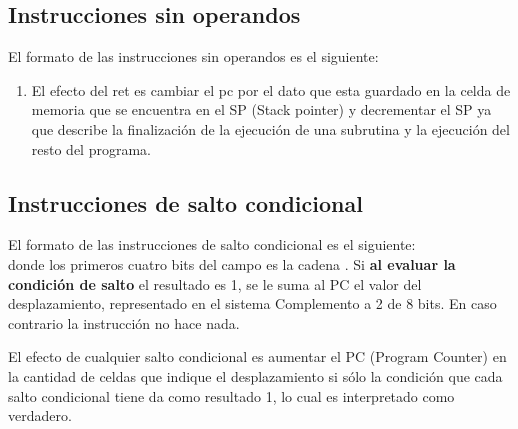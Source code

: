 \subsection{Instrucciones sin operandos}

El formato de las instrucciones sin operandos es el siguiente:\\



\begin{enumerate}
\item  {}
El efecto del ret es cambiar el pc por el dato que esta guardado en la celda de memoria que se encuentra en el SP (Stack pointer) y decrementar el SP ya que describe la finalización de la ejecución de una subrutina y la ejecución del resto del programa.
\end{enumerate}


\subsection{Instrucciones de salto condicional}

El formato de las instrucciones de salto condicional es el siguiente:\\

 donde los primeros cuatro bits del campo  es la cadena . Si \textbf{al evaluar la condición de salto} el resultado es 1, se le suma al PC el valor del desplazamiento, representado en el sistema Complemento a 2 de 8 bits. En caso contrario la instrucción no hace nada.


El efecto de cualquier salto condicional es aumentar el PC (Program Counter) en la cantidad de celdas que indique el desplazamiento si sólo la condición que cada salto condicional tiene da como resultado 1, lo cual es interpretado como verdadero.

